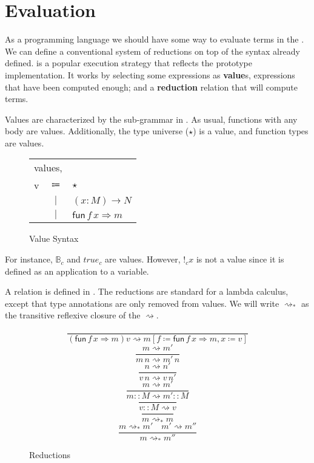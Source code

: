 \section{\SLang{} Evaluation}
As a programming language we should have some way to evaluate terms in the \slang{}.
We can define a conventional \cbv{} system of reductions on top of the syntax already defined.
\Cbv{} is a popular execution strategy that reflects the prototype implementation.
It works by selecting some expressions as \textbf{value}s, expressions that have been computed enough;
 and a \textbf{reduction} relation that will compute terms.

Values are characterized by the sub-grammar in .
As usual, functions with any body are values.
Additionally, the type universe ($\star$) is a value, and function types are values.
 
\begin{figure}
\begin{tabular}{lcl}
\multicolumn{3}{l}{values,}\tabularnewline
v & $\Coloneqq$ & $\star$\tabularnewline
 & $|$ & $\left(x:M\right)\rightarrow N$\tabularnewline
 & $|$ & $\mathsf{fun}\,f\,x\Rightarrow m$\tabularnewline
\end{tabular}\caption{\SLang{} Value Syntax}
\label{fig:surface-value-syntax}
\end{figure}
 
For instance, $\mathbb{B}_{c}$  and $true_{c}$ are values. %
However, $!_{c}x$ is not a value since it is defined as an application to a variable.
 
A \cbv{} relation is defined in .
The reductions are standard for a \cbv{} lambda calculus, except that type annotations are only removed from values.
We will write $\rightsquigarrow_{\ast}$ as the transitive reflexive closure of the $\rightsquigarrow$.
 
\begin{figure}
\[
\frac{\,}{\left(\mathsf{fun}\,f\,x\Rightarrow m\right)v\rightsquigarrow m\left[f\coloneqq\mathsf{fun}\,f\,x\Rightarrow m,x\coloneqq v\right]}
\]
\[
\frac{m\rightsquigarrow m'}{m\,n\rightsquigarrow m'\,n}
\]
\[
\frac{n\rightsquigarrow n'}{v\,n\rightsquigarrow v\,n'}
\]
\[
\frac{m\rightsquigarrow m'}{m::M\rightsquigarrow m'::M}
\]
\[
\frac{\,}{v::M\rightsquigarrow v}
\]
\[
\frac{\,}{m\rightsquigarrow_{\ast}m}
\]
\[
\frac{m\rightsquigarrow_{\ast}m'\quad m'\rightsquigarrow m''}{m\rightsquigarrow_{\ast}m''}
\]
 
\caption{\SLang{} \CbV{} Reductions}
\label{fig:surface-reduction-step}
\end{figure}
 
